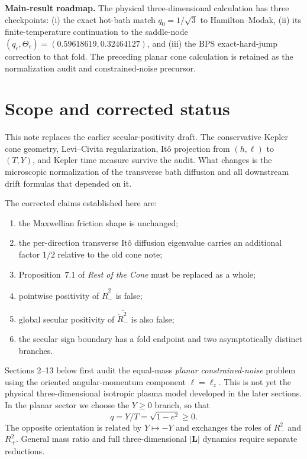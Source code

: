 \documentclass[11pt]{article}
\theoremstyle{remark}
\newcommand{\1}{\mathbf 1}
\begin{document}
\tableofcontents

\noindent\textbf{Main-result roadmap.}
The physical three-dimensional calculation has three checkpoints:
(i) the exact hot-bath match
$q_0=1/\sqrt3$ to Hamilton--Modak,
(ii) its finite-temperature continuation to the saddle-node
$(q_c,\Theta_c)=(0.59618619,0.32464127)$, and
(iii) the BPS exact-hard-jump correction to that fold.
The preceding planar cone calculation is retained as the normalization audit
and constrained-noise precursor.


\section{Scope and corrected status}

This note replaces the earlier secular-positivity draft.  The conservative
Kepler cone geometry, Levi--Civita regularization, It\^o projection from
$(h,\ell)$ to $(T,Y)$, and Kepler time measure survive the audit.  What changes
is the microscopic normalization of the transverse bath diffusion and all
downstream drift formulas that depended on it.

The corrected claims established here are:
\begin{enumerate}[leftmargin=2em]
\item the Maxwellian friction shape is unchanged;
\item the per-direction transverse It\^o diffusion eigenvalue carries an
additional factor $1/2$ relative to the old cone note;
\item Proposition~7.1 of \emph{Rest of the Cone} must be replaced as a whole;
\item pointwise positivity of $\dot R_-^2$ is false;
\item global secular positivity of $\overline{\dot R_-^2}$ is also false;
\item the secular sign boundary has a fold endpoint and two asymptotically
distinct branches.
\end{enumerate}

Sections 2--13 below first audit the equal-mass \emph{planar
constrained-noise} problem using the oriented angular-momentum component
$\ell=\ell_z$.  This is not yet the physical three-dimensional isotropic
plasma model developed in the later sections.  In the planar sector we choose
the $Y\ge0$ branch, so that
\[
q=Y/T=\sqrt{1-e^2}\ge0.
\]
The opposite orientation is related by $Y\mapsto-Y$ and exchanges the roles
of $R_-^2$ and $R_+^2$.  General mass ratio and full three-dimensional
$|\bm L|$ dynamics require separate reductions.
\end{document}
